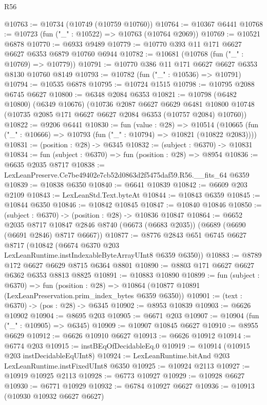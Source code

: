 \begin{lexlean}{R56}
\begin{coremodule}
@10763 := @10734 (@10749 (@10759 @10760))
@10764 := @10367 @6441
@10768 := @10723 (fun ("_" : @10522) => @10763 (@10764 @2069))
@10769 := @10521 @6878
@10770 := @6933 @9489
@10779 := @10770 @393 @11 @171 @6627 @6627 @6353 @6879 @10760 @6944
@10782 := @10681 (@10768 (fun ("_" : @10769) => @10779))
@10791 := @10770 @386 @11 @171 @6627 @6627 @6353 @8130 @10760 @8149
@10793 := @10782 (fun ("_" : @10536) => @10791)
@10794 := @10535 @6878
@10795 := @10724 @1515
@10798 := @10795 @2088 @6745 @6627
@10800 := @6348 @2084 @6353
@10821 := @10798
    (@6482 @10800)
    (@6349 @10676)
    (@10736
      @2087
      @6627
      @6629
      @6481
      @10800
      @10748
      (@10735 @2085 @171 @6627 @6627 @2084 @6353 (@10757 @2084) @10760))
@10822 := @9206 @6441
@10830 := fun (value : @28) =>
  @10514 (@10665 (fun ("_" : @10666) => @10793 (fun ("_" : @10794) => @10821 (@10822 @2083))))
@10831 := (position : @28) -> @6345
@10832 := (subject : @6370) -> @10831
@10834 := fun (subject : @6370) => fun (position : @28) => @8954
@10836 := @6635 @2035 @8717
@10838 := LexLeanPreserve.Ce7be49402e7cb52d0863d2f5475daf59.R56.__fits_64 @6359
@10839 := @10838 @6350
@10840 := @6641 @10839
@10842 := @6609 @203 @2109
@10843 := LexLeanStd.Text.byteAt
@10844 := @10843 @6359
@10845 := @10844 @6350
@10846 := @10842 @10845
@10847 := @10840 @10846
@10850 := (subject : @6370) -> (position : @28) -> @10836 @10847
@10864 := @6652
    @2035
    @8717
    @10847
    @2846
    @8740
    (@6673 (@6683 @2035))
    (@6689 (@6690 (@6691 @2846) @8717 @6667))
@10877 := @8776
    @2843
    @651
    @6745
    @6627
    @8717
    (@10842 (@6674 @6370 @203 LexLeanRuntime.instIndexableByteArrayUInt8 @6359 @6350))
@10883 := @8789 @172 @6627 @6629 @8715 @6364 @8801
@10890 := @8803 @171 @6627 @6627 @6362 @6353 @8813 @8825
@10891 := @10883 @10890
@10899 := fun (subject : @6370) =>
  fun (position : @28) => @10864 (@10877 @10891 (LexLeanPreservation.prim_index_bytes @6359 @6350))
@10901 := (text : @6370) -> (pos : @28) -> @6345
@10902 := @8953 @10839
@10903 := @6626 @10902
@10904 := @8695 @203
@10905 := @6671 @203
@10907 := @10904 (fun ("_" : @10905) => @6345)
@10909 := @10907 @10845 @6627
@10910 := @8955 @6629
@10912 := @6626 @10910 @6627
@10913 := @6626 @10912
@10914 := @6774 @203
@10915 := instBEqOfDecidableEq.{0}
@10919 := @10914 (@10915 @203 instDecidableEqUInt8)
@10924 := LexLeanRuntime.bitAnd @203 LexLeanRuntime.instFixedUInt8 @6350
@10925 := @10924 @2113
@10927 := @10919 @10925 @2113
@10928 := @6773 @10927
@10929 := @10928 @6627
@10930 := @6771 @10929
@10932 := @6784 @10927 @6627
@10936 := @10913 (@10930 @10932 @6627 @6627)

\end{coremodule}
\end{lexlean}
